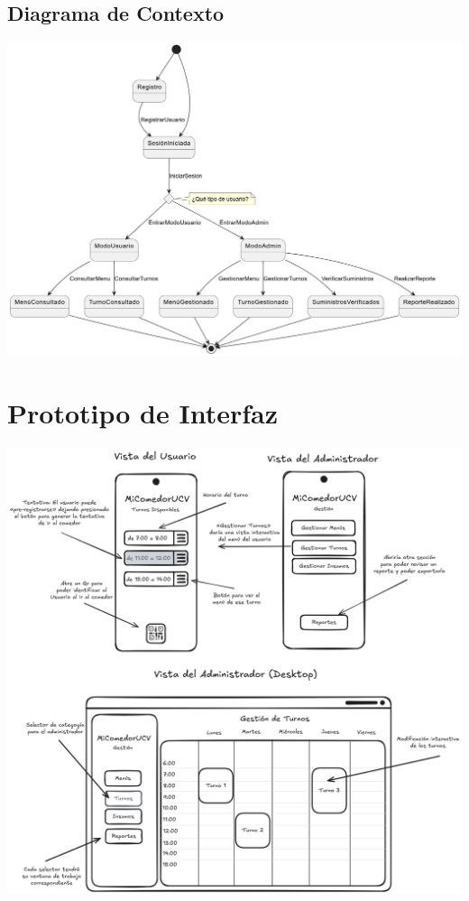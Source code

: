 \documentclass[12pt]{article}
\begin{document}
\pagebreak

\begin{landscape}
	\section{Diagrama de Contexto}
	\vspace{1cm}
	\begin{center}
		\includegraphics[width=19cm]{Requirements Discipline - Context Diagram.png}
	\end{center}
\end{landscape}

\pagebreak

\section{Prototipo de Interfaz}
\vspace{1cm}
\begin{center}
	\includegraphics[width=16cm]{Requitements Discipline - Prototipe Wireframe.png}
\end{center}
\end{document}
